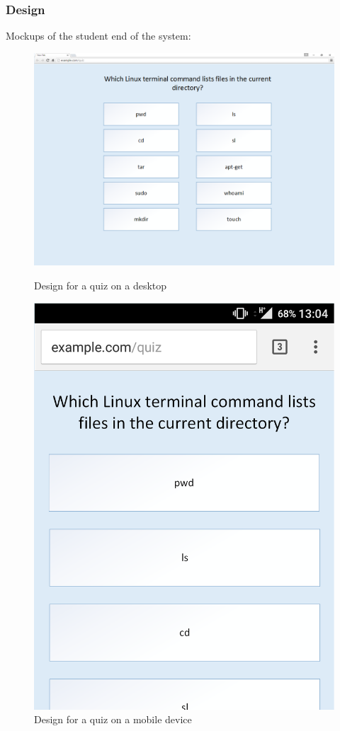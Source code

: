 \subsubsection{Design}
Mockups of the student end of the system: 
\begin{center}
	\begin{figure}
		\caption{Design for a quiz on a desktop}
		\includegraphics[width=\textwidth]{Chapter3/Iter-4/Quiz-Web-Design-Cropped}\\
		\label{fig:quiz-desktop}
	\end{figure}
	\vspace{1cm}
	\begin{figure}
		\caption{Design for a quiz on a mobile device}
		\includegraphics[scale=0.25]{Chapter3/Iter-4/Quiz-Mobile-Cropped}

\end{figure}
\end{center}
